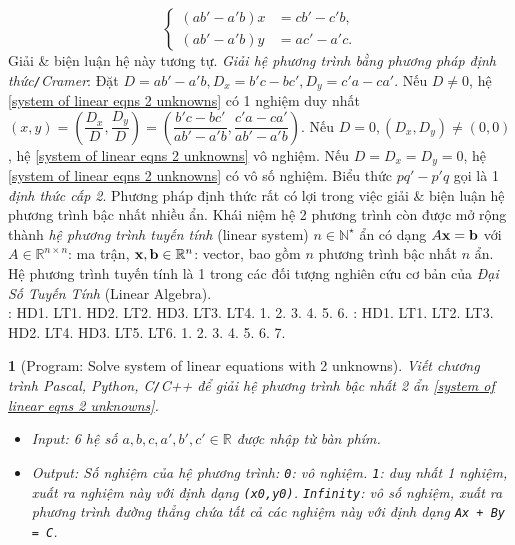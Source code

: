 \documentclass{article}
\newtheorem{baitoan}{}
\begin{document}
\begin{equation*}
\left\{\begin{split}
	(ab' - a'b)x &= cb' - c'b,\\
	(ab' - a'b)y &= ac' - a'c.
\end{split}\right.
\end{equation*}
Giải \& biện luận hệ này tương tự.  \textit{Giải hệ phương trình bằng phương pháp định thức{\tt/}Cramer}: Đặt $D = ab' - a'b,D_x = b'c - bc',D_y = c'a - ca'$. Nếu $D\ne0$, hệ \eqref{system of linear eqns 2 unknowns} có 1 nghiệm duy nhất $(x,y) = \left(\dfrac{D_x}{D},\dfrac{D_y}{D}\right) = \left(\dfrac{b'c - bc'}{ab' - a'b},\dfrac{c'a - ca'}{ab' - a'b}\right)$. Nếu $D = 0,(D_x,D_y)\ne(0,0)$, hệ \eqref{system of linear eqns 2 unknowns} vô nghiệm. Nếu $D = D_x = D_y = 0$, hệ \eqref{system of linear eqns 2 unknowns} có vô số nghiệm. Biểu thức $pq' - p'q$ gọi là 1 \textit{định thức cấp 2}. Phương pháp định thức rất có lợi trong việc giải \& biện luận hệ phương trình bậc nhất nhiều ẩn.  Khái niệm hệ 2 phương trình còn được mở rộng thành \textit{hệ phương trình tuyến tính} (linear system) $n\in\mathbb{N}^\star$ ẩn có dạng $A{\bf x} = {\bf b}$ với $A\in\mathbb{R}^{n\times n}$: ma trận, ${\bf x},{\bf b}\in\mathbb{R}^n$: vector, bao gồm $n$ phương trình bậc nhất $n$ ẩn. Hệ phương trình tuyến tính là 1 trong các đối tượng nghiên cứu cơ bản của \textit{Đại Số Tuyến Tính} (Linear Algebra).\\

\noindent\cite[\S2, pp. 12--18]{SGK_Toan_9_Canh_Dieu_tap_1}: HD1. LT1. HD2. LT2. HD3. LT3. LT4. 1. 2. 3. 4. 5. 6. \cite[\S3, pp. 19--25]{SGK_Toan_9_Canh_Dieu_tap_1}: HD1. LT1. LT2. LT3. HD2. LT4. HD3. LT5. LT6. 1. 2. 3. 4. 5. 6. 7.

\begin{baitoan}[{\sf Program}: Solve system of linear equations with 2 unknowns]
	Viết chương trình {\sf Pascal, Python, C{\tt/}C++} để giải hệ phương trình bậc nhất 2 ẩn \eqref{system of linear eqns 2 unknowns}.
	\begin{itemize}
		\item {\sf Input}: 6 hệ số $a,b,c,a',b',c'\in\mathbb{R}$ được nhập từ bàn phím.
		\item {\sf Output}: Số nghiệm của hệ phương trình: {\tt0}: vô nghiệm. {\tt1}: duy nhất 1 nghiệm, xuất ra nghiệm này với định dạng {\tt(x0,y0)}. {\tt Infinity}: vô số nghiệm, xuất ra phương trình đường thẳng chứa tất cả các nghiệm này với định dạng {\tt Ax + By = C}.
	\end{itemize}
\end{baitoan}
\end{document}
